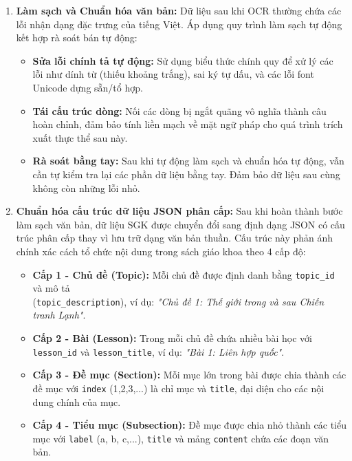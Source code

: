\begin{enumerate}
    \item \textbf{Làm sạch và Chuẩn hóa văn bản:}
    Dữ liệu sau khi OCR thường chứa các lỗi nhận dạng đặc trưng của tiếng Việt. Áp dụng quy trình làm sạch tự động kết hợp rà soát bán tự động:
    \begin{itemize}
        \item \textbf{Sửa lỗi chính tả tự động:} Sử dụng biểu thức chính quy để xử lý các lỗi như dính từ (thiếu khoảng trắng), sai ký tự dấu, và các lỗi font Unicode dựng sẵn/tổ hợp.
        \item \textbf{Tái cấu trúc dòng:} Nối các dòng bị ngắt quãng vô nghĩa thành câu hoàn chỉnh, đảm bảo tính liền mạch về mặt ngữ pháp cho quá trình trích xuất thực thể sau này.
        \item \textbf{Rà soát bằng tay:} Sau khi tự động làm sạch và chuẩn hóa tự động, vẫn cần tự kiểm tra lại các phần dữ liệu bằng tay. Đảm bảo dữ liệu sau cùng không còn những lỗi nhỏ.
    \end{itemize}
    \item \textbf{Chuẩn hóa cấu trúc dữ liệu JSON phân cấp:}
    Sau khi hoàn thành bước làm sạch văn bản, dữ liệu SGK được chuyển đổi sang định dạng JSON có cấu trúc phân cấp thay vì lưu trữ dạng văn bản thuần. Cấu trúc này phản ánh chính xác cách tổ chức nội dung trong sách giáo khoa theo 4 cấp độ:
    \begin{itemize}
        \item \textbf{Cấp 1 - Chủ đề (Topic):} Mỗi chủ đề được định danh bằng \texttt{topic\_id} và mô tả \\ (\texttt{topic\_description}), ví dụ: \textit{"Chủ đề 1: Thế giới trong và sau Chiến tranh Lạnh"}.
        \item \textbf{Cấp 2 - Bài (Lesson):} Trong mỗi chủ đề chứa nhiều bài học với \texttt{lesson\_id} và \texttt{lesson\_title}, ví dụ: \textit{"Bài 1: Liên hợp quốc"}.
        \item \textbf{Cấp 3 - Đề mục (Section):} Mỗi mục lớn trong bài được chia thành các đề mục với \texttt{index} (1,2,3,...) là chỉ mục và \texttt{title}, đại diện cho các nội dung chính của mục.
        \item \textbf{Cấp 4 - Tiểu mục (Subsection):} Đề mục được chia nhỏ thành các tiểu mục với \texttt{label} (a, b, c,...), \texttt{title} và mảng \texttt{content} chứa các đoạn văn bản.
    \end{itemize}
    

\end{enumerate}
